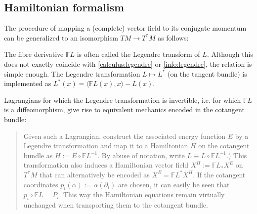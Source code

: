 \subsection{Hamiltonian formalism}

    The procedure of mapping a (complete) vector field to its conjugate momentum can be generalized to an isomorphism $TM\rightarrow T^*M$ as follows:
    \begin{remark}
        The fibre derivative $\mathbb{F}L$ is often called the Legendre transform of $L$. Although this does not exactly coincide with \ref{calculus:legendre} or \eqref{info:legendre}, the relation is simple enough. The Legendre transformation $L\mapsto L^*$ (on the tangent bundle) is implemented as $L^*(x) = \langle\mathbb{F}L(x),x\rangle - L(x)$.
    \end{remark}
    Lagrangians for which the Legendre transformation is invertible, i.e. for which $\mathbb{F}L$ is a diffeomorphism, give rise to equivalent mechanics encoded in the cotangent bundle:
    \begin{quote}
        Given such a Lagrangian, construct the associated energy function $E$ by a Legendre transformation and map it to a Hamiltonian $H$ on the cotangent bundle as $H:=E\circ\mathbb{F}L^{-1}$. By abuse of notation, write $L\equiv L\circ\mathbb{F}L^{-1}$.) This transformation also induces a Hamiltonian vector field $X^H:=\mathbb{F}L_*X^E$ on $T^*M$ that can alternatively be encoded as $X^E=\mathbb{F}L^*X^H$. If the cotangent coordinates $p_i(\alpha) := \alpha(\partial_i)$ are chosen, it can easily be seen that $p_i\circ\mathbb{F}L=P_i$. This way the Hamiltonian equations remain virtually unchanged when transporting them to the cotangent bundle.
    \end{quote}
